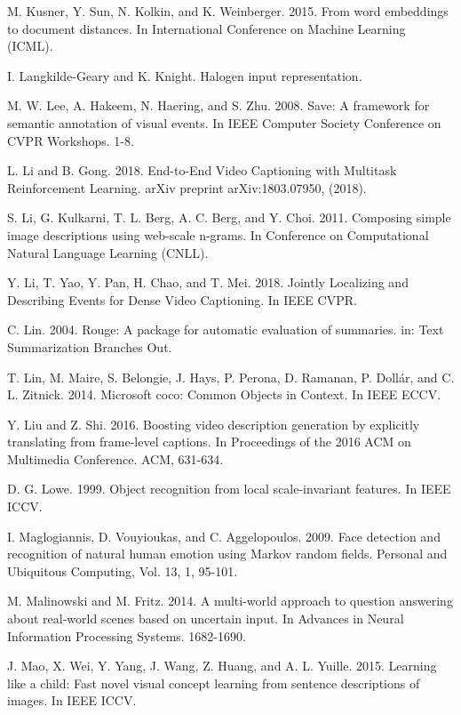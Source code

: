 \documentclass[10pt,journal,compsoc]{IEEEtran}
\begin{document}
\begin{thebibliography}{1}
M. Kusner, Y. Sun, N. Kolkin, and K. Weinberger. 2015. From word embeddings to document distances. In International Conference on Machine Learning (ICML).

I. Langkilde-Geary and K. Knight. Halogen input representation.

M. W. Lee, A. Hakeem, N. Haering, and S. Zhu. 2008. Save: A framework for semantic annotation
of visual events. In IEEE Computer Society Conference on CVPR Workshops. 1-8.

L. Li and B. Gong. 2018. End-to-End Video Captioning with Multitask Reinforcement Learning. arXiv preprint arXiv:1803.07950, (2018).

S. Li, G. Kulkarni, T. L. Berg, A. C. Berg, and Y. Choi. 2011. Composing simple image descriptions using web-scale n-grams. In Conference on Computational Natural Language Learning (CNLL).

Y. Li, T. Yao, Y. Pan, H. Chao, and T. Mei. 2018. Jointly Localizing and Describing Events for Dense Video Captioning. In IEEE CVPR.

C. Lin. 2004. Rouge: A package for automatic evaluation of summaries. in: Text Summarization Branches Out.

T. Lin, M. Maire, S. Belongie, J. Hays, P. Perona, D. Ramanan, P. Dollár, and C. L. Zitnick. 2014. Microsoft coco: Common Objects in Context. In IEEE ECCV.

Y. Liu and Z. Shi. 2016. Boosting video description generation by explicitly translating from frame-level captions. In Proceedings of the 2016 ACM on Multimedia Conference. ACM, 631-634.

D. G. Lowe. 1999. Object recognition from local scale-invariant features. In IEEE ICCV.

I. Maglogiannis, D. Vouyioukas, and C. Aggelopoulos. 2009. Face detection and recognition of
natural human emotion using Markov random fields. Personal and Ubiquitous Computing, Vol. 13, 1, 95-101.

M. Malinowski and M. Fritz. 2014. A multi-world approach to question answering about real-world scenes based on uncertain input. In Advances in Neural Information Processing Systems. 1682-1690.

J. Mao, X. Wei, Y. Yang, J. Wang, Z. Huang, and A. L. Yuille. 2015. Learning like a child: Fast novel visual concept learning from sentence descriptions of images. In IEEE ICCV.


\end{thebibliography}
\end{document}

